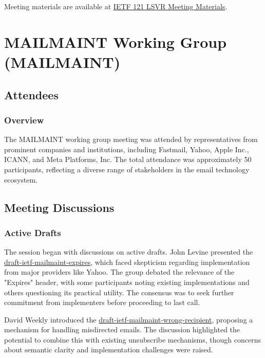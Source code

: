 \documentclass{article}
\begin{document}
Meeting materials are available at \href{https://datatracker.ietf.org/meeting/121/session/lsvr}{IETF 121 LSVR Meeting Materials}.



\newpage

\section{MAILMAINT Working Group (MAILMAINT)}

\subsection{Attendees}
\subsubsection{Overview}
The MAILMAINT working group meeting was attended by representatives from prominent companies and institutions, including Fastmail, Yahoo, Apple Inc., ICANN, and Meta Platforms, Inc. The total attendance was approximately 50 participants, reflecting a diverse range of stakeholders in the email technology ecosystem.

\subsection{Meeting Discussions}

\subsubsection{Active Drafts}
The session began with discussions on active drafts. John Levine presented the \href{https://datatracker.ietf.org/doc/html/draft-ietf-mailmaint-expires}{draft-ietf-mailmaint-expires}, which faced skepticism regarding implementation from major providers like Yahoo. The group debated the relevance of the "Expires" header, with some participants noting existing implementations and others questioning its practical utility. The consensus was to seek further commitment from implementers before proceeding to last call.

David Weekly introduced the \href{https://datatracker.ietf.org/doc/html/draft-ietf-mailmaint-wrong-recipient}{draft-ietf-mailmaint-wrong-recipient}, proposing a mechanism for handling misdirected emails. The discussion highlighted the potential to combine this with existing unsubscribe mechanisms, though concerns about semantic clarity and implementation challenges were raised.
\end{document}
